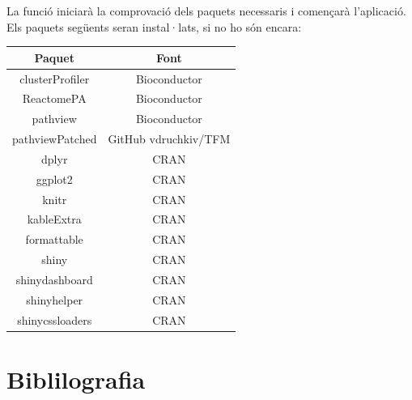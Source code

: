 \documentclass[]{article}
\begin{document}
La funció  iniciarà la comprovació dels paquets necessaris i començarà l'aplicació. Els paquets següents seran instal·lats, si no ho són encara:

\begin{center}
\begin{tabular}{||c | c ||} 
\hline\hline 
\textbf{Paquet} & \textbf{Font} \\ [0.5ex] 
\hline\hline
clusterProfiler & Bioconductor \\
\hline
ReactomePA & Bioconductor \\
\hline
pathview & Bioconductor \\ 
\hline
pathviewPatched & GitHub vdruchkiv/TFM\\
\hline
dplyr & CRAN \\
\hline 
ggplot2 & CRAN \\
\hline
knitr & CRAN \\
\hline
kableExtra & CRAN \\
\hline
formattable & CRAN \\
\hline
shiny & CRAN \\
\hline 
shinydashboard & CRAN \\ 
\hline
shinyhelper & CRAN \\
\hline 
shinycssloaders & CRAN\\
\hline\hline
\end{tabular}
\end{center}



\section*{Biblilografia}
\renewcommand{\section}[2]{}%


\end{document}

